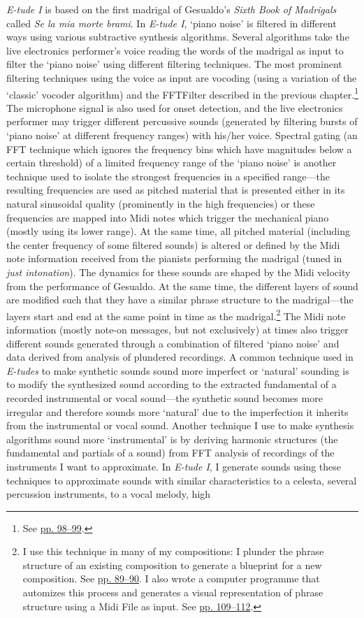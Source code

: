 \emph{E-tude I} is based on the first madrigal of Gesualdo's \emph{Sixth Book of Madrigals} called \emph{Se la mia morte brami}. In \emph{E-tude I}, `piano noise' is filtered in different ways using various subtractive synthesis algorithms. Several algorithms take the live electronics performer's voice reading the words of the madrigal as input to filter the `piano noise' using different filtering techniques. The most prominent filtering techniques using the voice as input are vocoding (using a variation of the `classic' vocoder algorithm) and the FFTFilter described in the previous chapter.\footnote{See \hyperlink{fftfilter}{pp. 98--99}.} The microphone signal is also used for onset detection, and the live electronics performer may trigger different percussive sounds (generated by filtering bursts of `piano noise' at different frequency ranges) with his/her voice. Spectral gating (an FFT technique which ignores the frequency bins which have magnitudes below a certain threshold) of a limited frequency range of the `piano noise' is another technique used to isolate the strongest frequencies in a specified range---the resulting frequencies are used as pitched material that is presented either in its natural sinusoidal quality (prominently in the high frequencies) or these frequencies are mapped into Midi notes which trigger the mechanical piano (mostly using its lower range). At the same time, all pitched material (including the center frequency of some filtered sounds) is altered or defined by the Midi note information received from the pianists performing the madrigal (tuned in \emph{just intonation}). The dynamics for these sounds are shaped by the Midi velocity from the performance of Gesualdo. At the same time, the different layers of sound are modified such that they have a similar phrase structure to the madrigal---the layers start and end at the same point in time as the madrigal.\footnote{I use this technique in many of my compositions: I plunder the phrase structure of an existing composition to generate a blueprint for a new composition. See \hyperlink{macroplunder}{pp. 89--90}. I also wrote a computer programme that automizes this process and generates a visual representation of phrase structure using a Midi File as input. See \hyperlink{scorevisual}{pp. 109--112}.} The Midi note information (mostly note-on messages, but not exclusively) at times also trigger different sounds generated through a combination of filtered `piano noise' and data derived from analysis of plundered recordings. A common technique used in \emph{E-tudes} to make synthetic sounds sound more imperfect or `natural' sounding is to modify the synthesized sound according to the extracted fundamental of a recorded instrumental or vocal sound---the synthetic sound becomes more irregular and therefore sounds more `natural' due to the imperfection it inherits from the instrumental or vocal sound. Another technique I use to make synthesis algorithms sound more `instrumental' is by deriving harmonic structures (the fundamental and partials of a sound) from FFT analysis of recordings of the instruments I want to approximate. In \emph{E-tude I}, I generate sounds using these techniques to approximate sounds with similar characteristics to a celesta, several percussion instruments, to a vocal melody, high 